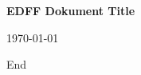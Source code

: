 \documentclass[10pt,a4paper]{article}
\begin{document}
\setlength{\parindent}{0pt}

\begin{center}
\huge
\vspace{1cm}

\textbf{EDFF Dokument Title}
\normalsize

\vspace{.5cm}
\today
\end{center}

\tableofcontents







\newpage %
\hspace{0pt}
\vfill
\centering
End
\vfill
\hspace{0pt}
\end{document}

